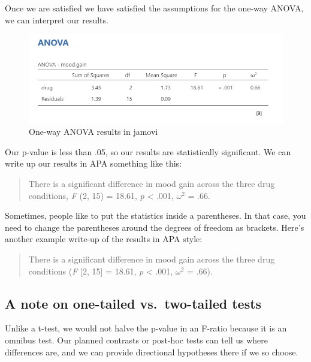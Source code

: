 \documentclass[
]{book}
\begin{document}
Once we are satisfied we have satisfied the assumptions for the one-way ANOVA, we can interpret our results.

\begin{figure}

{\centering \includegraphics[width=1\linewidth]{images/04_one-way-anova/one-way_results} 

}

\caption{One-way ANOVA results in jamovi}\label{fig:unnamed-chunk-5}
\end{figure}

Our p-value is less than .05, so our results are statistically significant. We can write up our results in APA something like this:

\begin{quote}
There is a significant difference in mood gain across the three drug conditions, \emph{F} (2, 15) = 18.61, \emph{p} \textless{} .001, \(\omega^2\) = .66.
\end{quote}

Sometimes, people like to put the statistics inside a parentheses. In that case, you need to change the parentheses around the degrees of freedom as brackets. Here's another example write-up of the results in APA style:

\begin{quote}
There is a significant difference in mood gain across the three drug conditions (\emph{F} {[}2, 15{]} = 18.61, \emph{p} \textless{} .001, \(\omega^2\) = .66).
\end{quote}

\hypertarget{a-note-on-one-tailed-vs.-two-tailed-tests}{%
\subsection{A note on one-tailed vs.~two-tailed tests}\label{a-note-on-one-tailed-vs.-two-tailed-tests}}

Unlike a t-test, we would not halve the p-value in an F-ratio because it is an omnibus test. Our planned contrasts or post-hoc tests can tell us where differences are, and we can provide directional hypotheses there if we so choose.
\end{document}

